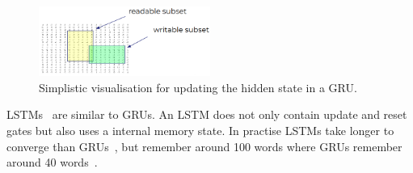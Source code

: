\begin{figure}[htbp]
    \begin{center}
        \includegraphics[width=0.5\textwidth]{figures/gru_subset.png}
    \end{center}
    \caption{Simplistic visualisation for updating the hidden state in a GRU.}
    \label{fig:gru_subset}
\end{figure}

LSTMs~\citep{hochreiter1997long} are similar to GRUs.
An LSTM does not only contain update and reset gates but also uses a internal memory state.
In practise LSTMs take longer to converge than GRUs~\citep{chung2014empirical}, but remember around 100 words where GRUs remember around 40 words~\citep{manning2017lectures}.

